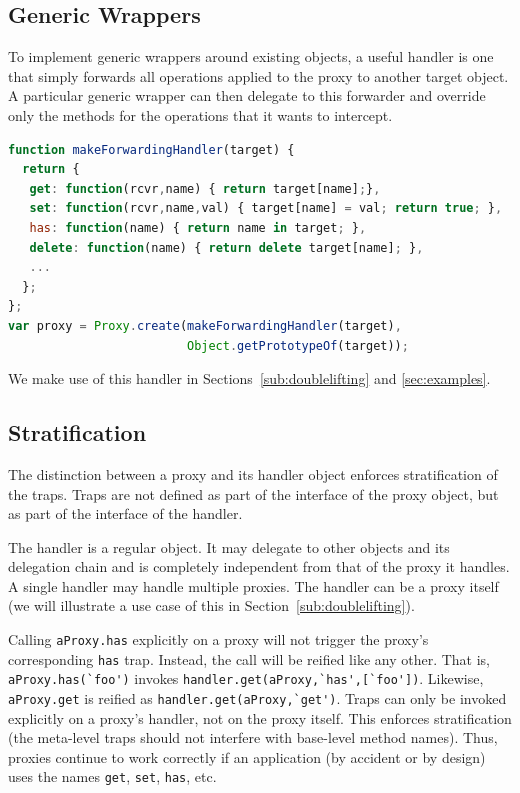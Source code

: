 \documentclass{sig-alternate}
\begin{document}
\subsection{Generic Wrappers}
\label{sub:wrappers}

To implement generic wrappers around existing objects, a useful handler is one that simply forwards all operations applied to the proxy to another target object. A particular generic wrapper can then delegate to this forwarder and override only the methods for the operations that it wants to intercept.

\begin{lstlisting}[language=javascript]
function makeForwardingHandler(target) {
  return {
   get: function(rcvr,name) { return target[name];},
   set: function(rcvr,name,val) { target[name] = val; return true; },
   has: function(name) { return name in target; },
   delete: function(name) { return delete target[name]; },
   ...
  };
};
var proxy = Proxy.create(makeForwardingHandler(target),
                         Object.getPrototypeOf(target));
\end{lstlisting}

We make use of this handler in Sections~\ref{sub:doublelifting} and \ref{sec:examples}.

\subsection{Stratification}
\label{sub:stratification}

The distinction between a proxy and its handler object enforces stratification of the traps. Traps are not defined as part of the interface of the proxy object, but as part of the interface of the handler.

The handler is a regular object. It may delegate to other objects and its delegation chain and is completely independent from that of the proxy it handles. A single handler may handle multiple proxies. The handler can be a proxy itself (we will illustrate a use case of this in Section~\ref{sub:doublelifting}).

Calling \lstinline{aProxy.has} explicitly on a proxy will not trigger the proxy's corresponding \texttt{has} trap. Instead, the call will be reified like any other. That is, \lstinline{aProxy.has(`foo')} invokes \lstinline{handler.get(aProxy,`has',[`foo'])}. Likewise, \lstinline{aProxy.get} is reified as \lstinline{handler.get(aProxy,`get')}. Traps can only be invoked explicitly on a proxy's handler, not on the proxy itself. This enforces stratification (the meta-level traps should not interfere with base-level method names). Thus, proxies continue to work correctly if an application (by accident or by design) uses the names \texttt{get}, \texttt{set}, \texttt{has}, etc.
\end{document}
